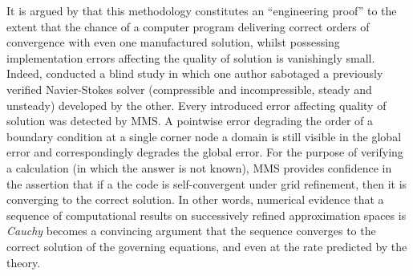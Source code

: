 It is argued by \citet{roache2002cvm} that this methodology constitutes an ``engineering proof'' to the extent that the chance of a computer program delivering correct orders of convergence with even one manufactured solution, whilst possessing implementation errors affecting the quality of solution is vanishingly small.
Indeed, \citet{knupp2002verification} conducted a blind study in which one author sabotaged a previously verified Navier-Stokes solver (compressible and incompressible, steady and unsteady) developed by the other.
Every introduced error affecting quality of solution was detected by MMS.
A pointwise error degrading the order of a boundary condition at a single corner node a domain is still visible in the global error and correspondingly degrades the global error.
For the purpose of verifying a calculation (in which the answer is not known), MMS provides confidence in the assertion that if a the code is self-convergent under grid refinement, then it is converging to the correct solution.
In other words, numerical evidence that a sequence of computational results on successively refined approximation spaces is \emph{Cauchy} becomes a convincing argument that the sequence converges to the correct solution of the governing equations, and even at the rate predicted by the theory.


